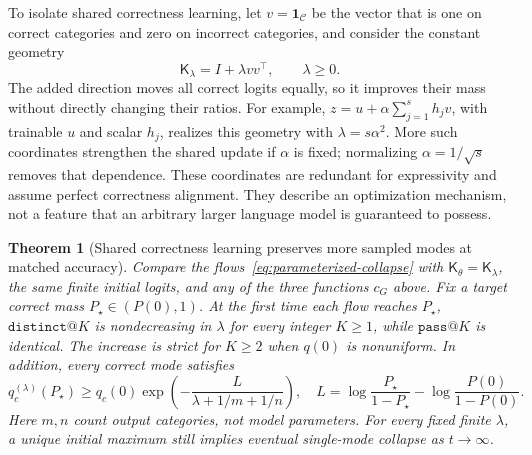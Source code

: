 \documentclass{article}
\newcommand{\1}{\mathbf 1}
\newtheorem{theorem}[lemma]{Theorem}
\theoremstyle{remark}
\theoremstyle{definition}
\theoremstyle{plain}
\begin{document}
To isolate shared correctness learning, let $v=\1_{\mathcal C}$ be the
vector that is one on correct categories and zero on incorrect categories,
and consider the constant geometry
\begin{equation}
 \mathsf K_\lambda=I+\lambda vv^\top,\qquad \lambda\ge0.
 \label{eq:shared-correctness-kernel}
\end{equation}
The added direction moves all correct logits equally, so it improves their
mass without directly changing their ratios. For example,
$z=u+\alpha\sum_{j=1}^s h_jv$, with trainable $u$ and scalar $h_j$, realizes
this geometry with $\lambda=s\alpha^2$. More such coordinates strengthen the
shared update if $\alpha$ is fixed; normalizing $\alpha=1/\sqrt{s}$ removes
that dependence. These coordinates are redundant for expressivity and assume
perfect correctness alignment. They describe an optimization mechanism, not
a feature that an arbitrary larger language model is guaranteed to possess.

\begin{theorem}[Shared correctness learning preserves more sampled modes at matched accuracy]
\label{thm:shared-correctness}
Compare the flows~\eqref{eq:parameterized-collapse} with
$\mathsf K_\theta=\mathsf K_\lambda$, the same finite initial logits, and any
of the three functions $c_G$ above. Fix a target correct mass
$P_\star\in(P(0),1)$. At the first time each flow reaches $P_\star$,
$\texttt{distinct@}K$ is nondecreasing in $\lambda$ for every integer $K\ge1$,
while $\texttt{pass@}K$ is identical. The increase is strict for $K\ge2$ when
$q(0)$ is nonuniform. In addition, every correct mode satisfies
\begin{equation}
 q_c^{(\lambda)}(P_\star)
 \ge q_c(0)\exp\!\left(-\frac{L}{\lambda+1/m+1/n}\right),
 \quad
 L=\log\frac{P_\star}{1-P_\star}-\log\frac{P(0)}{1-P(0)}.
 \label{eq:shared-correctness-bound}
\end{equation}
Here $m,n$ count output categories, not model parameters. For every fixed
finite $\lambda$, a unique initial maximum still implies eventual
single-mode collapse as $t\to\infty$.
\end{theorem}
\end{document}
